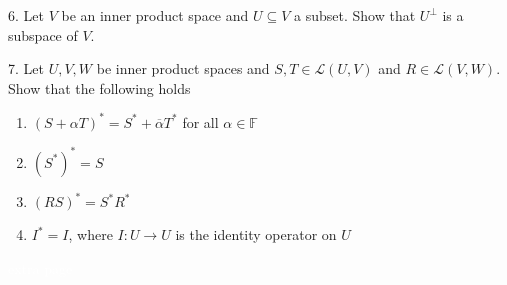 \documentclass{article}
\theoremstyle{remark} %
\newcommand{\F}{{\mathbb{F}}}
\begin{document}



6. Let $V$ be an inner product space and $U\subseteq V$ a subset. Show that $U^\perp$ is a subspace of $V$.
\vspace{11cm} %



7. Let $U,V,W$ be inner product spaces and $S,T \in \mathcal{L}(U,V)$ and $R\in \mathcal{L}(V,W)$. Show that the following holds
\begin{enumerate}
    \item $(S+\alpha T)^* = S^* + \overline{\alpha}T^*$ for all $\alpha\in \F$
    \item $(S^*)^* = S$
    \item $(RS)^* = S^*R^*$
    \item $I^* = I$, where $I \colon U \to U$ is the identity operator on $U$
\end{enumerate}


\newpage
\textcolor{white}{extra page}
\end{document}
